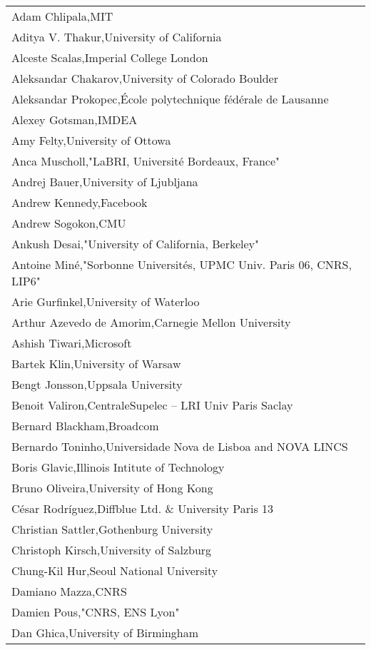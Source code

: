 
\begin{tabular}[t]{@{}p{\namewidth}}
Adam Chlipala,MIT\\
Aditya V. Thakur,University of California\\
Alceste Scalas,Imperial College London\\
Aleksandar Chakarov,University of Colorado Boulder\\
Aleksandar Prokopec,École polytechnique fédérale de Lausanne\\
Alexey Gotsman,IMDEA\\
Amy Felty,University of Ottowa\\
Anca Muscholl,"LaBRI, Université Bordeaux, France"\\
Andrej Bauer,University of Ljubljana\\
Andrew Kennedy,Facebook\\
Andrew Sogokon,CMU\\
Ankush Desai,"University of California, Berkeley"\\
Antoine Miné,"Sorbonne Universités, UPMC Univ. Paris 06, CNRS, LIP6"\\
Arie Gurfinkel,University of Waterloo\\
Arthur Azevedo de Amorim,Carnegie Mellon University\\
Ashish Tiwari,Microsoft\\
Bartek Klin,University of Warsaw\\
Bengt Jonsson,Uppsala University\\
Benoit Valiron,CentraleSupelec -- LRI Univ Paris Saclay\\
Bernard Blackham,Broadcom\\
Bernardo Toninho,Universidade Nova de Lisboa and NOVA LINCS\\
Boris Glavic,Illinois Intitute of Technology\\
Bruno Oliveira,University of Hong Kong\\
César Rodríguez,Diffblue Ltd. \& University Paris 13\\
Christian Sattler,Gothenburg University\\
Christoph Kirsch,University of Salzburg\\
Chung-Kil Hur,Seoul National University\\
Damiano Mazza,CNRS\\
Damien Pous,"CNRS, ENS Lyon"\\
Dan Ghica,University of Birmingham\\

\end{tabular}

